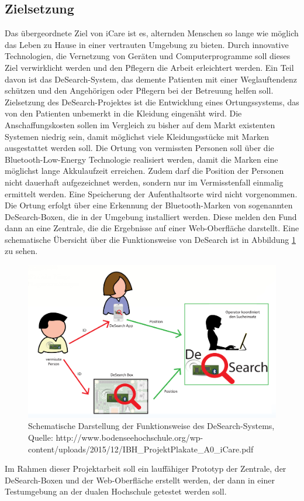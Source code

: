 \subsection{Zielsetzung}
Das übergeordnete Ziel von iCare ist es, alternden Menschen so lange wie möglich das Leben zu Hause in einer vertrauten Umgebung zu bieten. Durch innovative Technologien, die Vernetzung von Geräten und Computerprogramme soll dieses Ziel verwirklicht werden und den Pflegern die Arbeit erleichtert werden. Ein Teil davon ist das DeSearch-System, das demente Patienten mit einer Weglauftendenz schützen und den Angehörigen oder Pflegern bei der Betreuung helfen soll.
Zielsetzung des DeSearch-Projektes ist die Entwicklung eines Ortungssystems, das von den Patienten unbemerkt in die Kleidung eingenäht wird. Die Anschaffungskosten sollen im Vergleich zu bisher auf dem Markt existenten Systemen niedrig sein, damit möglichst viele Kleidungsstücke mit Marken ausgestattet werden soll. Die Ortung von vermissten Personen soll über die Bluetooth-Low-Energy Technologie realisiert werden, damit die Marken eine möglichst lange Akkulaufzeit erreichen. Zudem darf die Position der Personen nicht dauerhaft aufgezeichnet werden, sondern nur im Vermisstenfall einmalig ermittelt werden. Eine Speicherung der Aufenthaltsorte wird nicht vorgenommen. Die Ortung erfolgt über eine Erkennung der Bluetooth-Marken von sogenannten DeSearch-Boxen, die in der Umgebung installiert werden. Diese melden den Fund dann an eine Zentrale, die die Ergebnisse auf einer Web-Oberfläche darstellt. Eine schematische Übersicht über die Funktionsweise von DeSearch ist in Abbildung \ref{fig:desearch} zu sehen. 
\begin{figure}
	\centering
	\includegraphics[width=\textwidth]{images/iCare-Systematik}
	\caption[Funktionsweise des DeSearch-Systems]{Schematische Darstellung der Funktionsweise des DeSearch-Systems, Quelle: http://www.bodenseehochschule.org/wp-content/uploads/2015/12/IBH\_ProjektPlakate\_A0\_iCare.pdf }
	\label{fig:desearch}
\end{figure} 
Im Rahmen dieser Projektarbeit soll ein lauffähiger Prototyp der Zentrale, der DeSearch-Boxen und der Web-Oberfläche erstellt werden, der dann in einer Testumgebung an der dualen Hochschule getestet werden soll.

